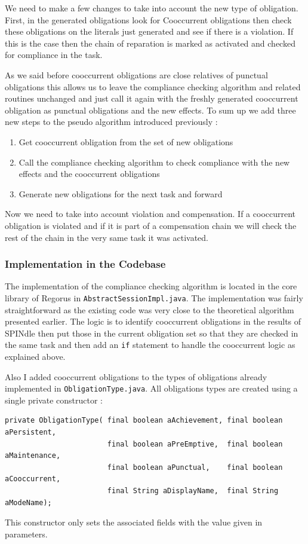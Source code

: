 \documentclass[10pt]{report}
\providecommand{\inlinecode}[1]{\lstinline$#1$} %
\begin{document}
We need to make a few changes to take into account the new type of obligation. First, in the generated obligations look for Cooccurrent obligations then check these obligations on the literals just generated and see if there is a violation. If this is the case then the chain of reparation is marked as activated and checked for compliance in the task.

As we said before cooccurrent obligations are close relatives of punctual obligations this allows us to leave the compliance checking algorithm and related routines unchanged and just call it again with the freshly generated cooccurrent obligation as punctual obligations and the new effects. To sum up we add three new steps to the pseudo algorithm introduced previously :
\begin{enumerate}
\item Get cooccurrent obligation from the set of new obligations
\item Call the compliance checking algorithm to check compliance with the new effects and the cooccurrent obligations
\item Generate new obligations for the next task and forward
\end{enumerate}

Now we need to take into account violation and compensation. If a cooccurrent obligation is violated and if it is part of a compensation chain we will check the rest of the chain in the very same task it was activated.

\subsubsection{Implementation in the Codebase}

The implementation of the compliance checking algorithm is located in the core library of Regorus in \inlinecode{AbstractSessionImpl.java}. The implementation was fairly straightforward as the existing code was very close to the theoretical algorithm presented earlier. The logic is to identify cooccurrent obligations in the results of SPINdle then put those in the current obligation set so that they are checked in the same task and then add an \texttt{if} statement to handle the cooccurrent logic as explained above.

Also I added cooccurrent obligations to the types of obligations already implemented in \inlinecode{ObligationType.java}. All obligations types are created using a single private constructor : 
\begin{lstlisting}
private ObligationType( final boolean aAchievement, final boolean aPersistent,
                        final boolean aPreEmptive,  final boolean aMaintenance,
                        final boolean aPunctual,    final boolean aCooccurrent,
                        final String aDisplayName,  final String aModeName);
\end{lstlisting}
This constructor only sets the associated fields with the value given in parameters.
\end{document}
